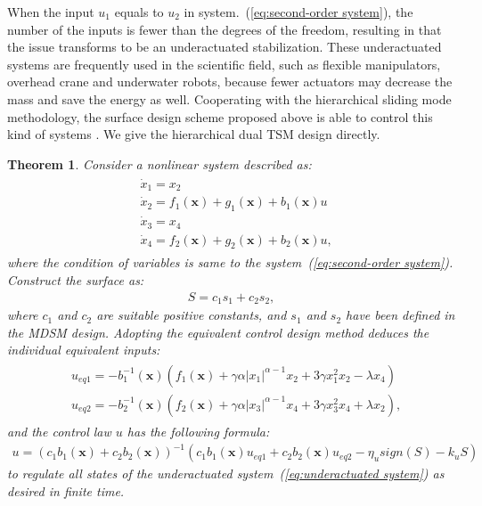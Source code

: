 \documentclass[3p]{elsarticle}
\theoremstyle{plain}
\newtheorem{mythm}{Theorem}
\theoremstyle{remark}
\begin{document}
When the input $u_1$ equals to $u_2$ in system.~(\ref{eq:second-order system}), the number of the inputs is fewer than the degrees of the freedom, resulting in that the issue transforms to be an underactuated stabilization. These underactuated systems are frequently used in the scientific field, such as flexible manipulators, overhead crane and underwater robots, because fewer actuators may decrease the mass and save the energy as well. Cooperating with the hierarchical sliding mode methodology, the surface design scheme proposed above is able to control this kind of systems \cite{wang2004design}. We give the hierarchical dual TSM design directly.
\begin{mythm}
Consider a nonlinear system described as:
\begin{align}
\begin{split}
&\dot x_1 = x_2\\
&\dot x_2 = f_1(\bm x) + g_1(\bm x)+b_1(\bm x)u\\
&\dot x_3 = x_4\\
&\dot x_4 = f_2(\bm x) + g_2(\bm x)+b_2(\bm x)u,\label{eq:underactuated system}
\end{split}
\end{align}
where the condition of variables is same to the system~(\ref{eq:second-order system}). Construct the surface as:
\begin{align}
S = c_1s_1+c_2s_2,
\end{align}
where $c_1$ and $c_2$ are suitable positive constants, and $s_1$ and $s_2$ have been defined in the MDSM design. Adopting the equivalent control design method deduces the individual equivalent inputs:
\begin{align}
\begin{split}
&u_{eq1} = -b_1^{-1}(\bm x)(f_1(\bm x)+\gamma\alpha\vert x_1\vert^{\alpha-1}x_2+3\gamma x_1^2x_2-\lambda x_4)\\
&u_{eq2} = -b_2^{-1}(\bm x)(f_2(\bm x)+\gamma\alpha\vert x_3\vert^{\alpha-1}x_4+3\gamma x_3^2x_4+\lambda x_2),
\end{split}
\end{align}
and the control law $u$ has the following formula:
\begin{align}
u = (c_1b_1(\bm x)+c_2b_2(\bm x))^{-1}(c_1b_1(\bm x)u_{eq1}+c_2b_2(\bm x)u_{eq2}-\eta_u sign(S)-k_u S)\label{eq:underactuated input}
\end{align}
to regulate all states of the underactuated system~(\ref{eq:underactuated system}) as desired in finite time.
\end{mythm}
\end{document}
